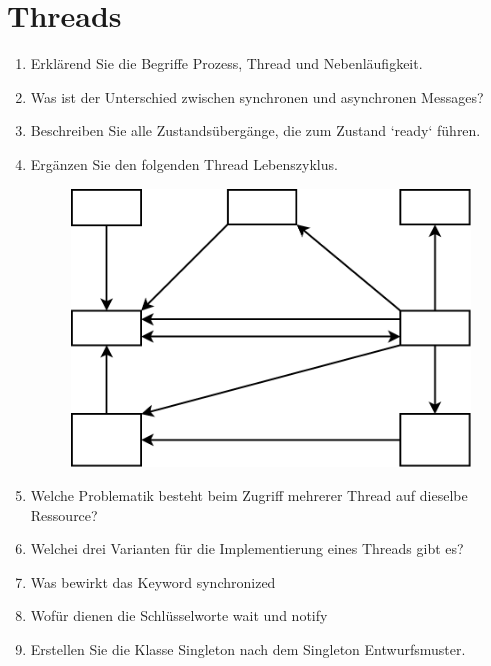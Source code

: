 \newpage
\section{Threads}

\begin{enumerate}
    \item Erklärend Sie die Begriffe Prozess, Thread und Nebenläufigkeit. 
    \item Was ist der Unterschied zwischen synchronen und asynchronen Messages?
    \item Beschreiben Sie alle Zustandsübergänge, die zum Zustand `ready` 
        führen. 
    \item Ergänzen Sie den folgenden Thread Lebenszyklus. 
        \begin{figure}[h!]
            \includegraphics[width=\textwidth]{../fig/4java-threads/lifecycle-empty.pdf}
        \end{figure}
    \item Welche Problematik besteht beim Zugriff mehrerer Thread auf dieselbe 
        Ressource? 
    \item Welchei drei Varianten für die Implementierung eines Threads gibt es?
    \item Was bewirkt das Keyword synchronized
    \item Wofür dienen die Schlüsselworte wait und notify
    \item Erstellen Sie die Klasse Singleton nach dem Singleton Entwurfsmuster.
\end{enumerate}
